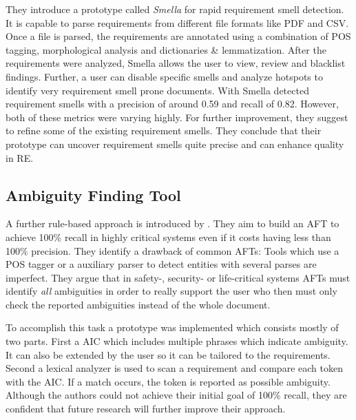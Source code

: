 They introduce a prototype called \textit{Smella} for rapid requirement smell detection.
It is capable to parse requirements from different file formats like \ac{PDF} and \ac{CSV}.
Once a file is parsed, the requirements are annotated using a combination of \ac{POS} tagging, morphological analysis and dictionaries \& lemmatization.
After the requirements were analyzed, Smella allows the user to view, review and blacklist findings.
Further, a user can disable specific smells and analyze hotspots to identify very requirement smell prone documents.
With Smella \textcite{Femmer:2017} detected requirement smells with a precision of around 0.59 and recall of 0.82.
However, both of these metrics were varying highly.
For further improvement, they suggest to refine some of the existing requirement smells.
They conclude that their prototype can uncover requirement smells quite precise and can enhance quality in \ac{RE}.

\subsection{Ambiguity Finding Tool}
A further rule-based approach is introduced by \textcite{Tjong:2013}.
They aim to build an \ac{AFT} to achieve 100\% recall in highly critical systems even if it costs having less than 100\% precision.
They identify a drawback of common \acp{AFT}:
Tools which use a \ac{POS} tagger or a auxiliary parser to detect entities with several parses are imperfect.
They argue that in safety-, security- or life-critical systems \acp{AFT} must identify \textit{all} ambiguities in order to really support the user who then must only check the reported ambiguities instead of the whole document.

To accomplish this task a prototype was implemented which consists mostly of two parts.
First a \ac{AIC} which includes multiple phrases which indicate ambiguity.
It can also be extended by the user so it can be tailored to the requirements.
Second a lexical analyzer is used to scan a requirement and compare each token with the \ac{AIC}.
If a match occurs, the token is reported as possible ambiguity.
Although the authors could not achieve their initial goal of 100\% recall, they are confident that future research will further improve their approach.


